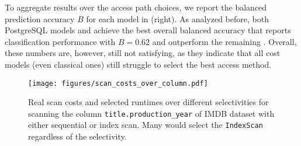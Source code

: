 To aggregate results over the access path choices, we report the balanced prediction accuracy $B$ for each model in  (right).
As analyzed before, both PostgreSQL models and \dace achieve the best overall balanced accuracy that reports classification performance with $B=0.62$ and outperform the remaining \lcms.
Overall, these numbers are, however, still not satisfying, as they indicate that all cost models (even classical ones) still struggle to select the best access method.

\begin{figure*}
    \centering
    \texttt{[image: figures/scan\_costs\_over\_column.pdf]}
    \caption{Real scan costs and selected runtimes over different selectivities for scanning the column \texttt{title.production\_year} of IMDB dataset with either sequential or index scan. 
    Many \lcms would select the \texttt{IndexScan} regardless of the selectivity.}
    \label{fig:scan_costs_over_col}
\end{figure*}

